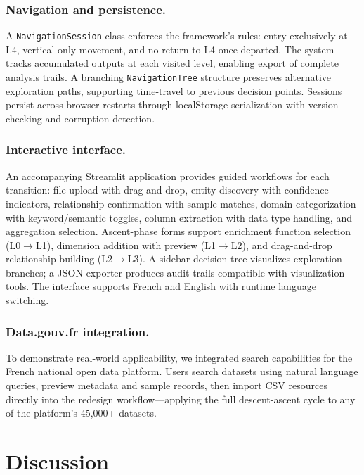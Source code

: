 \documentclass[Afour,times,sageh]{sagej}
\begin{document}
\subsubsection{Navigation and persistence.}
A \texttt{NavigationSession} class enforces the framework's rules: entry exclusively at L4, vertical-only movement, and no return to L4 once departed. The system tracks accumulated outputs at each visited level, enabling export of complete analysis trails. A branching \texttt{NavigationTree} structure preserves alternative exploration paths, supporting time-travel to previous decision points. Sessions persist across browser restarts through localStorage serialization with version checking and corruption detection.


\subsubsection{Interactive interface.}
\noindent An accompanying Streamlit application provides guided workflows for each transition: file upload with drag-and-drop, entity discovery with confidence indicators, relationship confirmation with sample matches, domain categorization with keyword/semantic toggles, column extraction with data type handling, and aggregation selection. Ascent-phase forms support enrichment function selection (L0$\to$L1), dimension addition with preview (L1$\to$L2), and drag-and-drop relationship building (L2$\to$L3). A sidebar decision tree visualizes exploration branches; a JSON exporter produces audit trails compatible with visualization tools. The interface supports French and English with runtime language switching.

\subsubsection{Data.gouv.fr integration.}
To demonstrate real-world applicability, we integrated search capabilities for the French national open data platform. Users search datasets using natural language queries, preview metadata and sample records, then import CSV resources directly into the redesign workflow---applying the full descent-ascent cycle to any of the platform's 45,000+ datasets.


\section{Discussion}
\label{sec:discussion}
\end{document}
